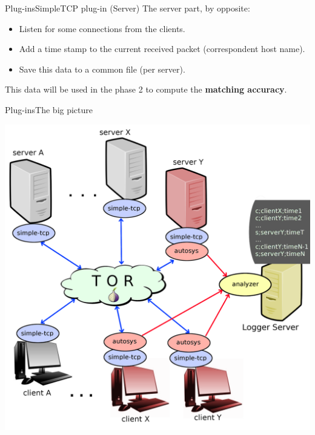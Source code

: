 \begin{frame}{Plug-ins}{SimpleTCP plug-in (Server)}
	The server part, by opposite:
	\begin{itemize}
		\item Listen for some connections from the clients.
		\item Add a time stamp to the current received packet (correspondent host name).
		\item Save this data to a common file (per server).
	\end{itemize}
	This data will be used in the phase 2 to compute the \textbf{matching accuracy}.
\end{frame}

\begin{frame}{Plug-ins}{The big picture}
	\begin{center}
		\includegraphics[scale=0.15]{img/scenario.png}
	\end{center}
\end{frame}
